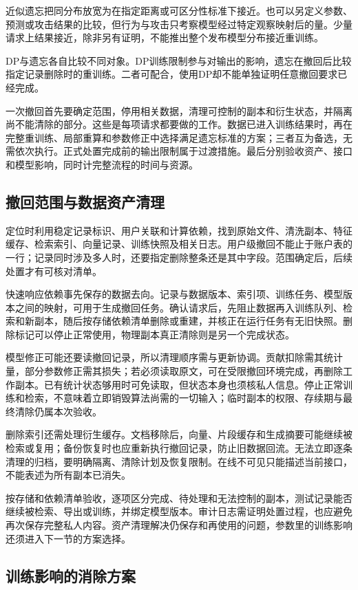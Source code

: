 近似遗忘把同分布放宽为在指定距离或可区分性标准下接近。也可以另定义参数、预测或攻击结果的比较，但行为与攻击只考察模型经过特定观察映射后的量。少量请求上结果接近，除非另有证明，不能推出整个发布模型分布接近重训练。

DP与遗忘各自比较不同对象。DP训练限制参与对输出的影响，遗忘在撤回后比较指定记录删除时的重训练。二者可配合，使用DP却不能单独证明任意撤回要求已经完成。

一次撤回首先要确定范围，停用相关数据，清理可控制的副本和衍生状态，并隔离尚不能清除的部分。这些是每项请求都要做的工作。数据已进入训练结果时，再在完整重训练、局部重算和参数修正中选择满足遗忘标准的方案；三者互为备选，无需依次执行。正式处置完成前的输出限制属于过渡措施。最后分别验收资产、接口和模型影响，同时计完整流程的时间与资源。

\subsection{撤回范围与数据资产清理}
\label{sec:privacy-asset-deletion}

定位时利用稳定记录标识、用户关联和计算依赖，找到原始文件、清洗副本、特征缓存、检索索引、向量记录、训练快照及相关日志。用户级撤回不能止于账户表的一行；记录同时涉及多人时，还要指定删除整条还是其中字段。范围确定后，后续处置才有可核对清单。

快速响应依赖事先保存的数据去向。记录与数据版本、索引项、训练任务、模型版本之间的映射，可用于生成撤回任务。确认请求后，先阻止数据再入训练队列、检索和新副本，随后按存储依赖清单删除或重建，并核正在运行任务有无旧快照。删除标记可以停止正常使用，物理副本真正清除则是另一个完成状态。

模型修正可能还要读撤回记录，所以清理顺序需与更新协调。贡献扣除需其统计量，部分参数修正需其损失；若必须读取原文，可在受限撤回环境完成，再删除工作副本。已有统计状态够用时可免读取，但状态本身也须核私人信息。停止正常训练和检索，不意味着立即销毁算法尚需的一切输入；临时副本的权限、存续期与最终清除仍属本次验收。

删除索引还需处理衍生缓存。文档移除后，向量、片段缓存和生成摘要可能继续被检索或复用；备份恢复时也应重新执行撤回记录，防止旧数据回流。无法立即逐条清理的归档，要明确隔离、清除计划及恢复限制。在线不可见只能描述当前接口，不能表述为所有副本已消失。

按存储和依赖清单验收，逐项区分完成、待处理和无法控制的副本，测试记录能否继续被检索、导出或训练，并绑定模型版本。审计日志需证明处置过程，也应避免再次保存完整私人内容。资产清理解决仍保存和再使用的问题，参数里的训练影响还须进入下一节的方案选择。

\subsection{训练影响的消除方案}
\label{sec:privacy-unlearning-methods}

